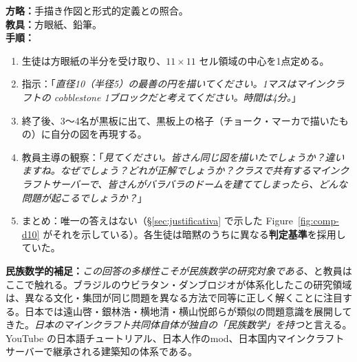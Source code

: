 \documentclass[12pt,a4paper]{scrartcl}
\newcommand{\acc}[1]{\textcolor{accent}{\textbf{#1}}}
\newcommand{\tempo}[1]{\textnormal{\footnotesize\color{bg!90!white}\textsf{#1}}}
\begin{document}
\begin{katsudou}[1.2 --- 課題提起 \quad\tempo{15分}]
\textbf{方略：}手描き作図と形式的定義との照合。 \\[0.4em]
\textbf{教具：}方眼紙、鉛筆。 \\[0.4em]
\textbf{手順：}
\begin{enumerate}[leftmargin=1.5em,itemsep=0.2em,topsep=0.3em,nosep]
  \item 生徒は方眼紙の半分を受け取り、$11 \times 11$ セル領域の中心を1点定める。
  \item 指示：「\emph{直径10（半径5）の最善の円を描いてください。\emph{1マスはマインクラフトの cobblestone 1ブロックだと考えてください}。時間は4分。}」
  \item 終了後、3〜4名が黒板に出て、黒板上の格子（チョーク・マーカで描いたもの）に自分の図を再現する。
  \item 教員主導の観察：「\emph{見てください。皆さん同じ図を描いたでしょうか？違いますね。なぜでしょう？どれが正解でしょうか？クラスで共有するマインクラフトサーバーで、皆さんがバラバラのドームを建ててしまったら、どんな問題が起こるでしょうか？}」
  \item まとめ：唯一の答えはない（§\ref{sec:justificativa} で示した Figure~\ref{fig:comp-d10} がそれを示している）。各生徒は暗黙のうちに異なる\acc{判定基準}を採用していた。
\end{enumerate}

\textbf{民族数学的補足：}\emph{この回答の多様性こそが民族数学の研究対象である}、と教員はここで触れる。ブラジルのウビラタン・ダンブロジオが体系化したこの研究領域は、異なる文化・集団が同じ問題を異なる方法で同等に正しく解くことに注目する。日本では遠山啓・銀林浩・横地清・横山悦郎らが類似の問題意識を展開してきた。\emph{日本のマインクラフト共同体自体が独自の「民族数学」を持つ}と言える。YouTube の日本語チュートリアル、日本人作のmod、日本国内マインクラフトサーバーで継承される建築知の体系である。
\end{katsudou}
\end{document}
